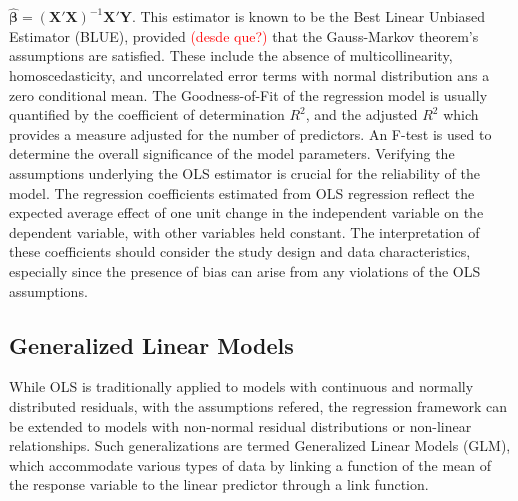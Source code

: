 \documentclass{aip-cp}
\begin{document}
$\hat{\boldsymbol{\beta}} = (\mathbf{X'X})^{-1}\mathbf{X'Y}$.
%
This estimator is known to be the Best Linear Unbiased Estimator (BLUE), provided \textcolor{red}{(desde que?)} that the Gauss-Markov theorem's assumptions are satisfied. These include the absence of  multicollinearity, homoscedasticity, and uncorrelated error terms with normal distribution ans a zero conditional mean.
%
The Goodness-of-Fit of the regression model is usually quantified by the coefficient of determination $R^2$, and the adjusted $R^2$ which provides a measure adjusted for the number of predictors. An F-test is used to determine the overall significance of the model parameters.
%
Verifying the assumptions underlying the OLS estimator is crucial for the reliability of the model. 
The regression coefficients estimated from OLS regression reflect the expected average effect of one unit change in the independent variable on the dependent variable, with other variables held constant. The interpretation of these coefficients should consider the study design and data characteristics, especially since the presence of bias can arise from any violations of the OLS assumptions.

\subsection{Generalized Linear Models}
While OLS is traditionally applied to models with continuous and normally distributed residuals, with the assumptions refered, the regression framework can be extended to models with non-normal residual distributions or non-linear relationships. Such generalizations are termed Generalized Linear Models (GLM), which accommodate various types of data by linking a function of the mean of the response variable to the linear predictor through a link function.
\end{document}
